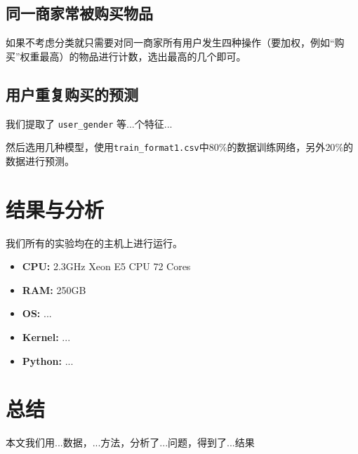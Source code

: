 \documentclass{acm_proc_article-sp}
\newcommand\TODO[1]{{\color{red}{Todo: #1}}}
\newcommand{\TBD}[1]{{\color{blue}#1}}
\begin{document}
\begin{spacing}{1.2}
\subsection{同一商家常被购买物品}
\TBD{如果不考虑分类就只需要对同一商家所有用户发生四种操作（要加权，例如“购买”权重最高）的物品进行计数，选出最高的几个即可。}

\subsection{用户重复购买的预测}
我们提取了 \texttt{user\_gender} 等...个特征...\TODO{给一个table}

然后选用\TBD{几种模型}，使用\texttt{train\_format1.csv}中$80\%$的数据训练网络，另外$20\%$的数据进行预测。

\TODO{特征工程}

\TODO{算法框架}

\TODO{模型、融合}


\section{结果与分析}
我们所有的实验均在\TODO{实验环境}的主机上进行运行。
\begin{itemize}
  \item \textbf{CPU:} 2.3GHz Xeon E5 CPU 72 Cores
  \item \textbf{RAM:} 250GB
  \item \textbf{OS:} \TBD{...}
  \item \textbf{Kernel:} \TBD{...}
  \item \textbf{Python:} \TBD{...}
\end{itemize}
\TODO{我们得到如下结果}

\section{总结}
\TBD{本文我们用...数据，...方法，分析了...问题，得到了...结果}

%
\begin{spacing}{1}

\end{spacing}
%
%
\end{spacing}
\end{document}
